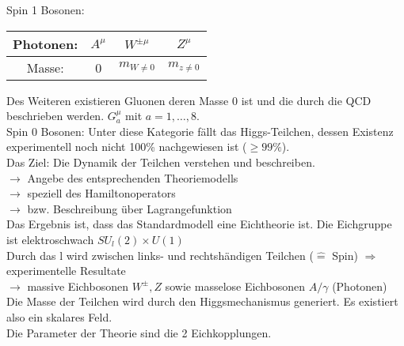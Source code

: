 Spin 1 Bosonen: 
\begin{center}
	\begin{tabular}{|c|c|c|c|}
		\hline Photonen: & $A^{\mu}$ & $ W^{\pm \mu} $ & $ Z^{\mu}$ \\ 
		\hline Masse: & 0 & $m_{W \neq 0} $ & $ m_{z \neq 0} $ \\ 
		\hline 
	\end{tabular} 
\end{center}
Des Weiteren existieren Gluonen deren Masse 0 ist und die durch die QCD 
beschrieben werden. $ G_a^{\mu}$ mit $ a=1,…,8 $. \\
\newline
Spin 0 Bosonen:
Unter diese Kategorie fällt das Higgs-Teilchen, dessen Existenz experimentell 
noch nicht 100\% nachgewiesen ist ($\ge 99\%$). \\
\newline
Das Ziel: Die Dynamik der Teilchen verstehen und beschreiben. \\
$\rightarrow$ Angebe des entsprechenden Theoriemodells \\
$\rightarrow$ speziell des Hamiltonoperators \\
$\rightarrow$ bzw. Beschreibung über Lagrangefunktion \\
\newline 
Das Ergebnis ist, dass das Standardmodell eine Eichtheorie ist. Die Eichgruppe 
ist elektroschwach $SU_l (2) \times U(1)$ \\
Durch das l wird zwischen links- und rechtshändigen Teilchen ($ \hat{=} $ Spin) 
$ \Rightarrow $ experimentelle Resultate \\
$\rightarrow$ massive Eichbosonen $W^{\pm}, Z$ sowie masselose Eichbosonen 
$A/\gamma$ (Photonen) \\
Die Masse der Teilchen wird durch den Higgsmechanismus generiert. Es existiert 
also ein skalares Feld. \\
Die Parameter der Theorie sind die 2 Eichkopplungen.  
